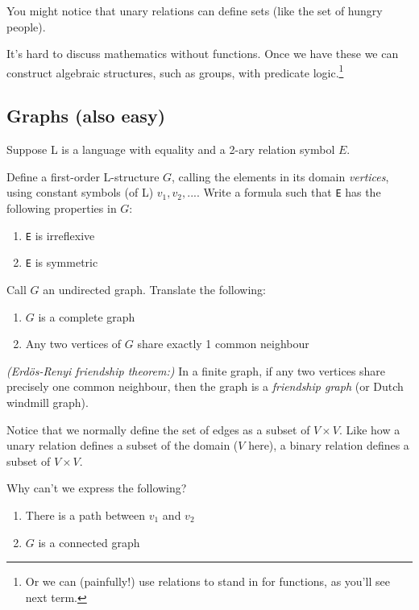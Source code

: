 \documentclass[10pt,a4paper]{article}
\begin{document}
You might notice that unary relations can define sets (like the set of hungry people).


It's hard to discuss mathematics without functions.
Once we have these we can construct algebraic structures, such as groups, 
with predicate logic.\footnote{Or we can (painfully!) use relations to stand in for functions, as you'll see next term.}

\subsection{Graphs (also easy)}
Suppose L is a language with equality and a 2-ary relation symbol \(E\).

Define a first-order L-structure \(G\), 
calling the elements in its domain \emph{vertices}, 
using constant symbols (of L) \(v_1, v_2, ...\).
Write a formula such that \texttt{E} has the following properties in \(G\):

\begin{enumerate}
    \item \texttt{E} is irreflexive
    \item \texttt{E} is symmetric
\end{enumerate}

Call \(G\) an undirected graph. Translate the following:

\begin{enumerate}
    \item \(G\) is a complete graph
    \item Any two vertices of \(G\) share exactly 1 common neighbour
\end{enumerate}

\emph{(Erd\"os-Renyi friendship theorem:)} In a finite graph, 
if any two vertices share precisely one common neighbour, 
then the graph is a \emph{friendship graph} (or Dutch windmill graph).

Notice that we normally define the set of edges as a subset of \(V \times V\). 
Like how a unary relation defines a subset of the domain (\(V\) here), 
a binary relation defines a subset of \(V \times V\).

Why can't we express the following?
\begin{enumerate}
    \item There is a path between \(v_1\) and \(v_2\)
    \item \(G\) is a connected graph
\end{enumerate}
\end{document}
